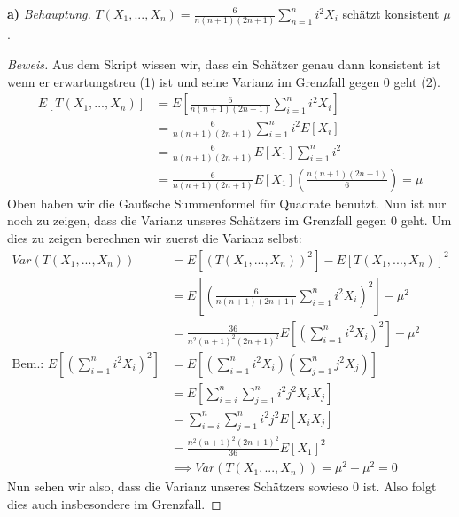 \documentclass[a4paper]{article}
\newcommand{\beh}{\textit{Behauptung. }}
\newenvironment{Aufgabe}[2][Aufgabe]{\begin{trivlist}
\item[\hskip \labelsep {\bfseries #1}\hskip \labelsep {\bfseries #2.}]}{\end{trivlist}}
\begin{document}
\begin{theorem} %
\begin{Aufgabe}{2} %
\end{Aufgabe}

\textbf{a)}
\beh $T \left(
	X_1, ..., X_{n}
\right) = \frac{ 6 }{ n( n+1 ) ( 2n +1 ) }
\sum_{n=1}^{n} i ^2 X_{i}$ schätzt konsistent $\mu$.

\begin{proof}[Beweis]
	Aus dem Skript wissen wir, dass ein Schätzer genau dann konsistent ist wenn
	er erwartungstreu (1) ist und seine Varianz im Grenzfall gegen $0$ geht (2).
	\begin{align*}
	E \left[
		T \left(
			X_1, ..., X_n
		\right)
	\right] &= E \left[
	\frac{ 6 }{ n( n+1 )( 2n +1 ) }
		\sum_{i=1}^{n} i ^2 X_i
	\right] \\
			&= \frac{ 6 }{n ( n+1 ) ( 2n +1)}
			\sum_{i=1}^{n} i ^2 E \left[
				X_i
			\right] \\
			&= \frac{ 6 }{ n( n+1 ) ( 2n +1) } E \left[
				X_1
			\right] \sum_{i=1}^{n} i ^2 \\
			&= \frac{ 6 }{ n( n+1 ) ( 2n +1) } E \left[
				X_1
			\right] \left(
			\frac{ n (n+ 1 ) ( 2n +1)}{ 6 }
			\right) = \mu
	\end{align*}
	Oben haben wir die Gaußsche Summenformel für Quadrate benutzt. Nun ist nur noch zu
	zeigen, dass die Varianz unseres Schätzers im Grenzfall gegen $0$ geht. Um dies zu
	zeigen berechnen wir zuerst die Varianz selbst:
	\begin{align*}
		Var ( 
		T \left(
			X_1, ..., X_n
		\right)
		) &= E \left[
			\left(
				T \left(
					X_1, ..., X_n
				\right)
			\right) ^2
		\right] - E \left[
			T \left(
				X_1, ..., X_n
			\right)
		\right] ^2 \\
		  &= E \left[
		  	\left(
				\frac{ 6 }{ n(n+1)(2n+1) }
				\sum_{i=1}^{n} i ^2 X_i
		  	\right) ^2
		  \right] - \mu ^2 \\
		  &= \frac{ 36 }{ n ^2 (n+1) ^2 (2n + 1) ^2 }
		  E \left[
		  	\left(
		  		\sum_{i=1}^{n} i ^2 X_i
		  	\right) ^2
		  \right] - \mu ^2 \\
		  \text{Bem.: } E \left[
		  	\left(
		  		\sum_{i=1}^{n} i ^2 X_i
		  	\right) ^2
		\right] &= E \left[
			\left(
				\sum_{i=1}^{n} i ^2 X_i
			\right) 
			\left(
				\sum_{j=1}^{n} j ^2 X_j
			\right) 
		\right] \\
				&= E \left[
					\sum_{i=i}^{n} 
					\sum_{j=1}^{n} i ^2 j ^2 X_i X_j
				\right] \\
				&= \sum_{i=i}^{n} 
					\sum_{j=1}^{n} i ^2 j ^2 E \left[
						X_i X_j
					\right] \\
				&= \frac{ n ^2 (n+1) ^2 (2n +1) ^2 }{ 36 } E \left[
					X_1
				\right]  ^2 \\
				& \implies Var(
					T \left(
						X_1, ..., X_n
					\right)
				) = \mu ^2 - \mu ^2 = 0
	\end{align*}
	Nun sehen wir also, dass die Varianz unseres Schätzers sowieso $0$ ist. Also folgt
	dies auch insbesondere im Grenzfall.
\end{proof}
\end{theorem}
\end{document}
